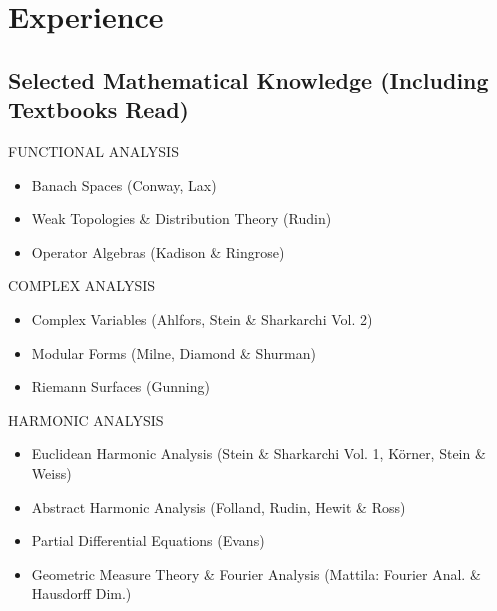\documentclass{friggeri-cv}
\begin{document}
\section{Experience}

\subsection{Selected Mathematical Knowledge (Including Textbooks Read)}

\begin{entrylist}


\entries
{FUNCTIONAL ANALYSIS}
{
\begin{itemize}
    \setlength\itemsep{-1em}
    \item Banach Spaces (Conway, Lax)\\
    \item Weak Topologies \& Distribution Theory (Rudin)\\
    \item Operator Algebras (Kadison \& Ringrose)
\end{itemize}
}



\entries
{COMPLEX ANALYSIS}
{
\begin{itemize}
    \setlength\itemsep{-1em}
    \item Complex Variables (Ahlfors, Stein \& Sharkarchi Vol. 2)\\
    \item Modular Forms (Milne, Diamond \& Shurman)\\
    \item Riemann Surfaces (Gunning)
\end{itemize}
}


\entries
{HARMONIC ANALYSIS}
{
\begin{itemize}
    \setlength\itemsep{-1em}
    \item Euclidean Harmonic Analysis (Stein \& Sharkarchi Vol. 1, K\"{o}rner, Stein \& Weiss)\\
    \item Abstract Harmonic Analysis (Folland, Rudin, Hewit \& Ross)\\
    \item Partial Differential Equations (Evans)\\
    \item Geometric Measure Theory \& Fourier Analysis (Mattila: Fourier Anal. \& Hausdorff Dim.)
\end{itemize}
}


\end{entrylist}
\end{document}
